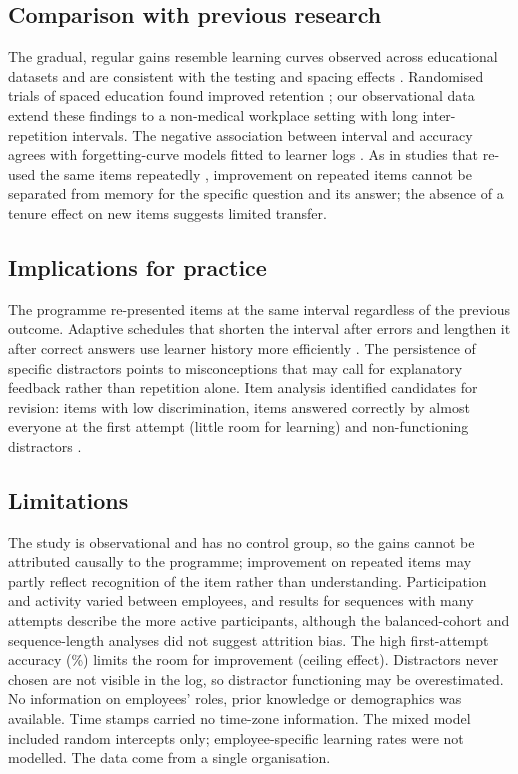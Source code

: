 \subsection{Comparison with previous research}
The gradual, regular gains resemble learning curves observed across educational datasets
\citep{koedinger2023} and are consistent with the testing and spacing effects
\citep{roediger2006,cepeda2006}. Randomised trials of spaced education found improved retention
\citep{kerfoot2007mededuc,kerfoot2009}; our observational data extend these findings to a
non-medical workplace setting with long inter-repetition intervals. The negative association between
interval and accuracy agrees with forgetting-curve models fitted to learner logs
\citep{settles2016,tabibian2019}. As in studies that re-used the same items repeatedly
\citep{donker2022}, improvement on repeated items cannot be separated from memory for the specific
question and its answer; the absence of a tenure effect on new items suggests limited transfer.

\subsection{Implications for practice}
The programme re-presented items at the same interval regardless of the previous outcome. Adaptive
schedules that shorten the interval after errors and lengthen it after correct answers use learner
history more efficiently \citep{lindsey2014,settles2016,tabibian2019}. The persistence of specific
distractors points to misconceptions that may call for explanatory feedback rather than repetition
alone. Item analysis identified candidates for revision: items with low discrimination, items
answered correctly by almost everyone at the first attempt (little room for learning) and
non-functioning distractors \citep{tarrant2009,gierl2017}.

\subsection{Limitations}
The study is observational and has no control group, so the gains cannot be attributed causally to
the programme; improvement on repeated items may partly reflect recognition of the item rather than
understanding. Participation and activity varied between employees, and results for sequences with
many attempts describe the more active participants, although the balanced-cohort and
sequence-length analyses did not suggest attrition bias. The high first-attempt accuracy
(\AccFirst\%) limits the room for improvement (ceiling effect). Distractors never chosen are not
visible in the log, so distractor functioning may be overestimated. No information on employees'
roles, prior knowledge or demographics was available. Time stamps carried no time-zone information.
The mixed model included random intercepts only; employee-specific learning rates were not
modelled. The data come from a single organisation. 

